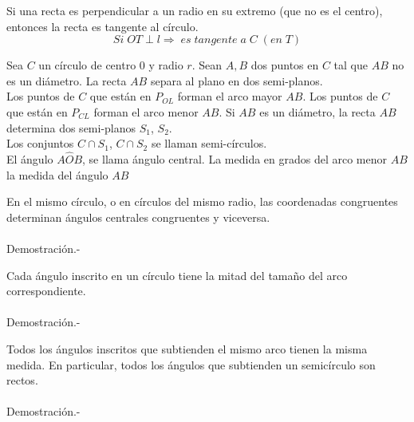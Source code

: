     \begin{proposicion}
	Si una recta es perpendicular a un radio en su extremo (que no es el centro), entonces la recta es tangente al círculo.
	$$Si \; OT \perp l \Rightarrow \; es \; tangente \; a \; C \; (en \; T)$$
    \end{proposicion}

\begin{tcolorbox}[colframe=white]
    \begin{def.}
	Sea $C$ un círculo de centro $0$ y radio $r$. Sean $A,B$ dos puntos en $C$ tal que $AB$ no es un diámetro. La recta $AB$ separa al plano en dos semi-planos.\\
	Los puntos de $C$ que están en $P_{OL}$ forman el arco mayor $AB$. Los puntos de $C$ que están en $P_{CL}$ forman el arco menor $AB$. Si $AB$ es un diámetro, la recta $AB$ determina dos semi-planos $S_1$, $S_2$.\\
	Los conjuntos $C \cap S_1$, $C\cap S_2$ se llaman semi-círculos.\\
	El ángulo $A\widehat{O}B$, se llama ángulo central. La medida en grados del arco menor $AB$ la medida del ángulo $AB$
    \end{def.}
\end{tcolorbox}

\begin{proposicion} En el mismo círculo, o en círculos del mismo radio, las coordenadas congruentes determinan ángulos centrales congruentes y viceversa.\\\\
    Demostración.-\;
\end{proposicion}

\begin{proposicion} Cada ángulo inscrito en un círculo tiene la mitad del tamaño del arco correspondiente.\\\\
    Demostración.-\;
\end{proposicion}

    \begin{cor} Todos los ángulos inscritos que subtienden el mismo arco tienen la misma medida. En particular, todos los ángulos que subtienden un semicírculo son rectos.\\\\
	Demostración.-\;
    \end{cor}

